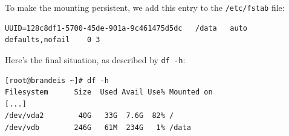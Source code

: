 To make the mounting persistent, we add this entry to the \texttt{/etc/fstab} file:

\begin{verbatim}
UUID=128c8df1-5700-45de-901a-9c461475d5dc	/data	auto defaults,nofail	0 3
\end{verbatim}

Here's the final situation, as described by \texttt{df -h}:

\begin{verbatim}
[root@brandeis ~]# df -h
Filesystem      Size  Used Avail Use% Mounted on
[...]
/dev/vda2        40G   33G  7.6G  82% /
/dev/vdb        246G   61M  234G   1% /data
\end{verbatim}